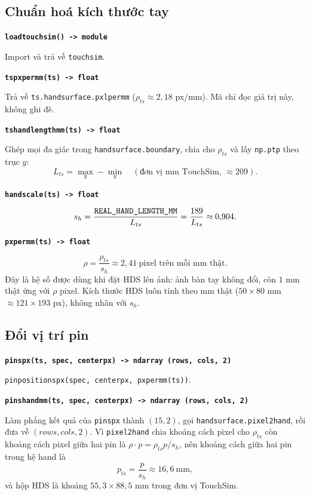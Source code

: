 \documentclass[11pt,a4paper]{article}
\renewcommand{\_}{\textunderscore\hspace{0pt}}
\newcommand{\code}[1]{\texttt{#1}}
\newcommand{\hs}{\ensuremath{s_h}}
\newcommand{\sig}[1]{\par\smallskip\noindent\textbf{\texttt{#1}}\par\nopagebreak}
\begin{document}
\subsection{Chuẩn hoá kích thước tay}
\sig{load\_touchsim() -> module}
Import và trả về \code{touchsim}.

\sig{ts\_px\_per\_mm(ts) -> float}
Trả về \code{ts.hand\_surface.pxl\_per\_mm} ($\rho_{ts}\approx2{,}18$ px/mm). Mã chỉ đọc giá trị này, không ghi đè.

\sig{ts\_hand\_length\_mm(ts) -> float}
Ghép mọi đa giác trong \code{hand\_surface.boundary}, chia cho $\rho_{ts}$ và lấy \code{np.ptp} theo trục $y$:
\begin{equation}
L_{ts}=\max_y-\min_y \quad(\text{đơn vị mm TouchSim, } \approx209).
\end{equation}

\sig{hand\_scale(ts) -> float}
\begin{equation}
\hs=\frac{\code{REAL\_HAND\_LENGTH\_MM}}{L_{ts}}=\frac{189}{L_{ts}}\approx0{,}904 .
\end{equation}

\sig{px\_per\_mm(ts) -> float}
\begin{equation}
\rho=\frac{\rho_{ts}}{\hs}\approx2{,}41\ \text{pixel trên mỗi mm thật}.
\end{equation}
Đây là hệ số được dùng khi đặt HDS lên ảnh: ảnh bàn tay không đổi, còn $1$ mm thật ứng với $\rho$ pixel. Kích thước HDS luôn tính theo mm thật ($50\times80$ mm $\approx121\times193$ px), không nhân với $\hs$.

\subsection{Đổi vị trí pin}
\sig{pins\_px(ts, spec, center\_px) -> ndarray (rows, cols, 2)}
\code{pin\_positions\_px(spec, center\_px, px\_per\_mm(ts))}.

\sig{pins\_hand\_mm(ts, spec, center\_px) -> ndarray (rows, cols, 2)}
Làm phẳng kết quả của \code{pins\_px} thành $(15,2)$, gọi \code{hand\_surface.pixel2hand}, rồi đưa về $(rows, cols, 2)$. Vì \code{pixel2hand} chia khoảng cách pixel cho $\rho_{ts}$ còn khoảng cách pixel giữa hai pin là $\rho\cdot p=\rho_{ts}p/\hs$, nên khoảng cách giữa hai pin trong hệ hand là
\begin{equation}
p_{ts}=\frac{p}{\hs}\approx16{,}6\ \text{mm},
\end{equation}
và hộp HDS là khoảng $55{,}3\times88{,}5$ mm trong đơn vị TouchSim.
\end{document}
